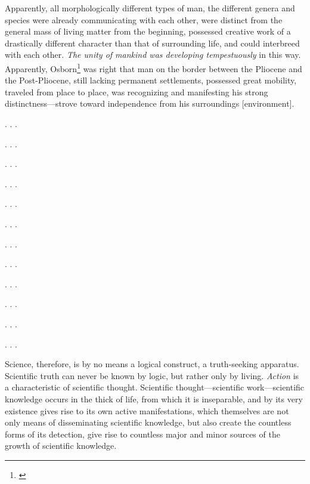 Apparently, all morphologically different types of man, the different genera
and species were already communicating with each other, were distinct from the
general mass of living matter from the beginning, possessed creative work of a
drastically different character than that of surrounding life, and could
interbreed with each other.  \emph{The unity of mankind was developing
tempestuously} in this way.  Apparently, Osborn\footnote{\cite{osborn1910age}}
was right that man on the border between the Pliocene and the Post-Pliocene,
still lacking permanent settlements, possessed great mobility, traveled from
place to place, was recognizing and manifesting his strong
distinctness---strove toward independence from his surroundings [environment].

\Section %

. . .

\Section %

. . .

\Section %

. . .

\Section %

. . .

\Section %

. . .

\Section %

. . .

\Section %

. . .

\Section %

. . .

\Section %

. . .

\Section %

. . .

\Section %

. . .

\Section %

. . .

\Section %
Science, therefore, is by no means a logical construct, a truth-seeking
apparatus.  Scientific truth can never be known by logic, but rather only by
living.  \emph{Action }is a characteristic of scientific thought.  Scientific
thought---scientific work---scientific knowledge occurs in the thick of life,
from which it is inseparable, and by its very existence gives rise to its own
active manifestations, which themselves are not only means of disseminating
scientific knowledge, but also create the countless forms of its detection,
give rise to countless major and minor sources of the growth of scientific
knowledge.

